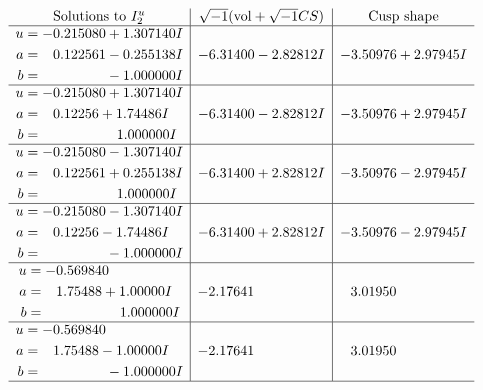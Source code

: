 \documentclass[1p]{elsarticle_modified}
\theoremstyle{definition}
\newcommand{\I}{\sqrt{-1}}
\begin{document}
$$\begin{array}{c|c|c}  
\text{Solutions to }I^u_{2}& \I (\text{vol} + \sqrt{-1}CS) & \text{Cusp shape}\\
 \hline 
\begin{aligned}
u &= -0.215080 + 1.307140 I \\
a &= \phantom{-}0.122561 - 0.255138 I \\
b &= \phantom{-0.000000 } -1.000000 I\end{aligned}
 & -6.31400 - 2.82812 I & -3.50976 + 2.97945 I \\ \hline\begin{aligned}
u &= -0.215080 + 1.307140 I \\
a &= \phantom{-}0.12256 + 1.74486 I \\
b &= \phantom{-0.000000 -}1.000000 I\end{aligned}
 & -6.31400 - 2.82812 I & -3.50976 + 2.97945 I \\ \hline\begin{aligned}
u &= -0.215080 - 1.307140 I \\
a &= \phantom{-}0.122561 + 0.255138 I \\
b &= \phantom{-0.000000 -}1.000000 I\end{aligned}
 & -6.31400 + 2.82812 I & -3.50976 - 2.97945 I \\ \hline\begin{aligned}
u &= -0.215080 - 1.307140 I \\
a &= \phantom{-}0.12256 - 1.74486 I \\
b &= \phantom{-0.000000 } -1.000000 I\end{aligned}
 & -6.31400 + 2.82812 I & -3.50976 - 2.97945 I \\ \hline\begin{aligned}
u &= -0.569840\phantom{ +0.000000I} \\
a &= \phantom{-}1.75488 + 1.00000 I \\
b &= \phantom{-0.000000 -}1.000000 I\end{aligned}
 & -2.17641\phantom{ +0.000000I} & \phantom{-}3.01950\phantom{ +0.000000I} \\ \hline\begin{aligned}
u &= -0.569840\phantom{ +0.000000I} \\
a &= \phantom{-}1.75488 - 1.00000 I \\
b &= \phantom{-0.000000 } -1.000000 I\end{aligned}
 & -2.17641\phantom{ +0.000000I} & \phantom{-}3.01950\phantom{ +0.000000I}\\
 \hline 
 \end{array}$$\newpage
\end{document}
